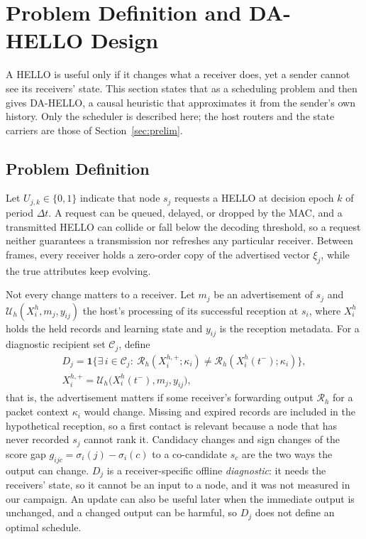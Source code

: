 \section{Problem Definition and DA-HELLO Design}
\label{sec:design}
A HELLO is useful only if it changes what a receiver does, yet a sender cannot see its receivers' state. This section states that as a scheduling problem and then gives DA-HELLO, a causal heuristic that approximates it from the sender's own history. Only the scheduler is described here; the host routers and the state carriers are those of Section~\ref{sec:prelim}.

\subsection{Problem Definition}
\label{sec:problem}
Let $U_{j,k}\in\{0,1\}$ indicate that node $s_j$ requests a HELLO at decision epoch $k$ of period $\Delta t$. A request can be queued, delayed, or dropped by the MAC, and a transmitted HELLO can collide or fall below the decoding threshold, so a request neither guarantees a transmission nor refreshes any particular receiver. Between frames, every receiver holds a zero-order copy of the advertised vector $\xi_j$, while the true attributes keep evolving.

Not every change matters to a receiver. Let $m_j$ be an advertisement of $s_j$ and $\mathcal{U}_h(X_i^h,m_j,y_{ij})$ the host's processing of its successful reception at $s_i$, where $X^h_i$ holds the held records and learning state and $y_{ij}$ is the reception metadata. For a diagnostic recipient set $\mathcal{C}_j$, define
\begin{multline}
D_j=\mathbf{1}\big\{\exists\, i\in\mathcal{C}_j:\ \mathcal{R}_h(X_i^{h,+};\kappa_i)\neq \mathcal{R}_h(X_i^h(t^-);\kappa_i)\big\},\\
X_i^{h,+}=\mathcal{U}_h\big(X_i^h(t^-),m_j,y_{ij}\big),
\label{eq:relevance}
\end{multline}
that is, the advertisement matters if some receiver's forwarding output $\mathcal{R}_h$ for a packet context $\kappa_i$ would change. Missing and expired records are included in the hypothetical reception, so a first contact is relevant because a node that has never recorded $s_j$ cannot rank it. Candidacy changes and sign changes of the score gap $g_{ijc}=\sigma_i(j)-\sigma_i(c)$ to a co-candidate $s_c$ are the two ways the output can change. $D_j$ is a receiver-specific offline \emph{diagnostic}: it needs the receivers' state, so it cannot be an input to a node, and it was not measured in our campaign. An update can also be useful later when the immediate output is unchanged, and a changed output can be harmful, so $D_j$ does not define an optimal schedule.

